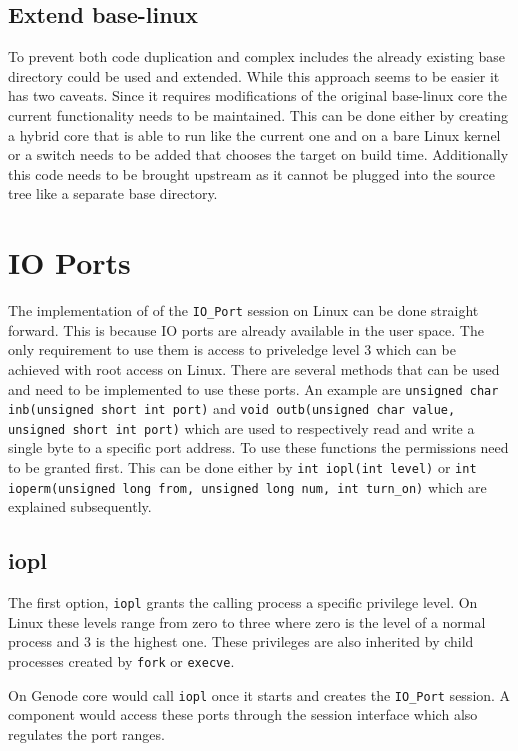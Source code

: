 \documentclass[
a4paper,
12pt,
notitlepage,
parskip=half,
DIV=11,
]{scrbook}
\begin{document}
		\subsection{Extend base-linux}
		To prevent both code duplication and complex includes the already existing base directory could be used and extended.
		While this approach seems to be easier it has two caveats.
		Since it requires modifications of the original base-linux core the current functionality needs to be maintained.
		This can be done either by creating a hybrid core that is able to run like the current one and on a bare Linux kernel or a switch needs to be added that chooses the target on build time.
		Additionally this code needs to be brought upstream as it cannot be plugged into the source tree like a separate base directory.
		
		\section{IO Ports}
		
		The implementation of of the \texttt{IO\_Port} session on Linux can be done straight forward.
		This is because IO ports are already available in the user space.
		The only requirement to use them is access to priveledge level 3 which can be achieved with root access on Linux.
		There are several methods that can be used and need to be implemented to use these ports.
		An example are \texttt{unsigned char inb(unsigned short int port)} and \texttt{void outb(unsigned char value, unsigned short int port)} which are used to respectively read and write a single byte to a specific port address.
		To use these functions the permissions need to be granted first.
		This can be done either by \texttt{int iopl(int level)} or \texttt{int ioperm(unsigned long from, unsigned long num, int turn\_on)} which are explained subsequently. \citep{outb} \citep{ioperm} \citep{iopl}
				
		\subsection{iopl}
		
		The first option, \texttt{iopl} grants the calling process a specific privilege level.
		On Linux these levels range from zero to three where zero is the level of a normal process and 3 is the highest one.
		These privileges are also inherited by child processes created by \texttt{fork} or \texttt{execve}. \citep{iopl}
		
		On Genode core would call \texttt{iopl} once it starts and creates the \texttt{IO\_Port} session.
		A component would access these ports through the session interface which also regulates the port ranges.
		
\end{document}
